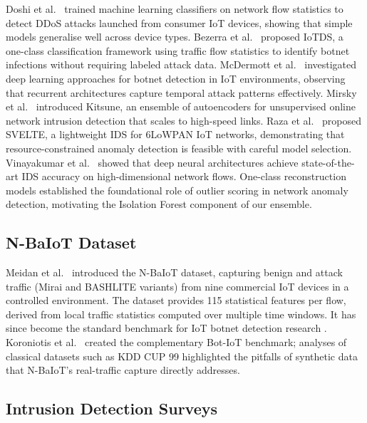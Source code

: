 \documentclass[conference]{IEEEtran}
\begin{document}
Doshi et al.\ \cite{doshi2018machine} trained machine learning classifiers
on network flow statistics to detect DDoS attacks launched from consumer IoT
devices, showing that simple models generalise well across device types.
Bezerra et al.\ \cite{bezerra2019iotds} proposed IoTDS, a one-class
classification framework using traffic flow statistics to identify botnet
infections without requiring labeled attack data. McDermott et al.\
\cite{mcdermott2018botnet} investigated deep learning approaches for
botnet detection in IoT environments, observing that recurrent architectures
capture temporal attack patterns effectively. Mirsky et al.\
\cite{mirsky2018kitsune} introduced Kitsune, an ensemble of autoencoders for
unsupervised online network intrusion detection that scales to high-speed
links. Raza et al.\ \cite{raza2013svelte} proposed SVELTE, a lightweight
IDS for 6LoWPAN IoT networks, demonstrating that resource-constrained
anomaly detection is feasible with careful model selection. Vinayakumar
et al.\ \cite{vinayakumar2019deep} showed that deep neural architectures
achieve state-of-the-art IDS accuracy on high-dimensional network flows.
One-class reconstruction models \cite{hawkins2002outlier} established the
foundational role of outlier scoring in network anomaly detection,
motivating the Isolation Forest component of our ensemble.

\subsection{N-BaIoT Dataset}

Meidan et al.\ \cite{meidan2018nbaiot} introduced the N-BaIoT dataset,
capturing benign and attack traffic (Mirai and BASHLITE variants) from nine
commercial IoT devices in a controlled environment. The dataset provides 115
statistical features per flow, derived from local traffic statistics computed
over multiple time windows. It has since become the standard benchmark for
IoT botnet detection research \cite{chandola2009anomaly,buczak2016survey}.
Koroniotis et al.\ \cite{koroniotis2019bot} created the complementary
Bot-IoT benchmark; analyses of classical datasets such as KDD CUP 99
\cite{tavallaee2009detailed} highlighted the pitfalls of synthetic data
that N-BaIoT's real-traffic capture directly addresses.

\subsection{Intrusion Detection Surveys}
\end{document}
